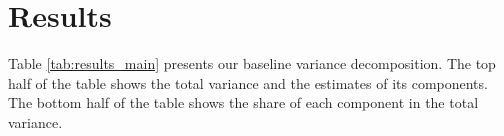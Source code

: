 \documentclass[12pt]{article}
\theoremstyle{definition}
\theoremstyle{remark}
\begin{document}
\label{}










\section{Results}\label{sec:results}

Table \ref{tab:results_main}
presents our baseline variance decomposition. 
The top half of the table shows the total variance and
the estimates of its components. The bottom half of the table shows the share of each component in the total variance. 
\end{document}
